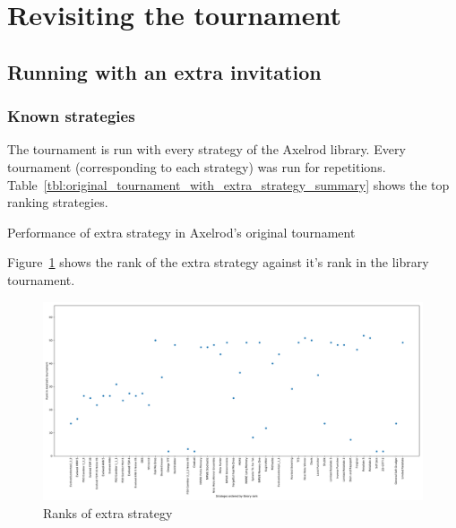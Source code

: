 \documentclass{article}
\begin{document}
\section{Revisiting the tournament}\label{sec:revisiting}

\subsection{Running with an extra invitation}\label{sec:extra_strategy}

\subsubsection{Known strategies}

The tournament is run with every strategy of the Axelrod library.
Every tournament (corresponding to each strategy) was run
for repetitions.
Table~\ref{tbl:original_tournament_with_extra_strategy_summary} shows the top
ranking strategies.

\begin{table}[!hbtp]
        \footnotesize
        \centering
        
        \caption{Performance of extra strategy in Axelrod's original tournament}
        \label{tbl:original_tournament_with_extra_strategy_summary}
\end{table}

Figure~\ref{fig:original_tournament_with_extra_strategy_ranks_vs_library_ranks}
shows the rank of the extra strategy against it's rank in the library
tournament.

\begin{figure}[!hbtp]
    \centering
    \includegraphics[width=.8\textwidth]{assets/original_tournament_with_extra_strategy_ranks_vs_library_ranks.pdf}
    \caption{Ranks of extra strategy}
    \label{fig:original_tournament_with_extra_strategy_ranks_vs_library_ranks}
\end{figure}
\end{document}
